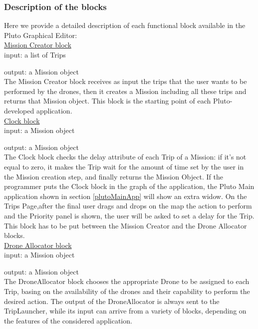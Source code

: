 \subsubsection {Description of the blocks}\label{blocks}

Here we provide a detailed description of each functional block available in the Pluto Graphical Editor:
\\

\underline{Mission Creator block}
\\

input: a list of Trips

output: a Mission object
\\

The Mission Creator block receives as input the trips that the user wants to be performed by the drones, then it creates a Mission including all these trips and returns that Mission object.
This block is the starting point of each Pluto-developed application.
\\



\underline{Clock block}
\\

input: a Mission object

output: a Mission object
\\

The Clock block checks the delay attribute of each Trip of a Mission: if it's not equal to zero, it makes the Trip wait for the amount of time set by the user in the Mission creation step, and finally returns the Mission Object.
If the programmer puts the Clock block in the graph of the application, the Pluto Main application shown in section \ref{plutoMainApp} will show an extra widow.
On the Trips Page,after the final user drags and drops on the map the action to perform and the Priority panel is shown, the user will be asked to set a delay for the Trip.
This block has to be put between the Mission Creator and the Drone Allocator blocks.
\\

\underline{Drone Allocator block}
\\

input: a Mission object

output: a Mission object
\\

The DroneAllocator block chooses the appropriate Drone to be assigned to each Trip, basing on the availability of the drones and their capability to perform the desired action.
The output of the DroneAllocator is always sent to the TripLauncher, while its input can arrive from a variety of blocks, depending on the features of the considered application.
\\


